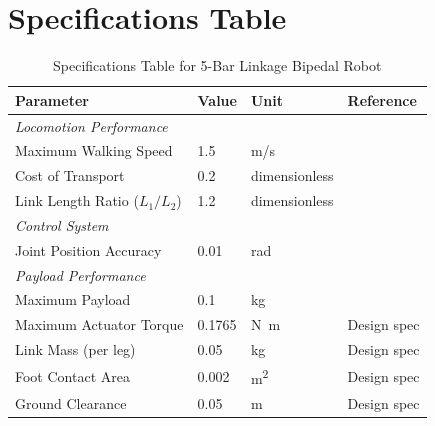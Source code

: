\documentclass[12pt]{article}
\renewcommand{\arraystretch}{2} %
\begin{document}




\section*{Specifications Table}

\begin{table}[H]
\centering
\renewcommand{\arraystretch}{1.3}
\begin{tabular}{p{} p{} l p{}}
\toprule
\textbf{Parameter} & \textbf{Value} & \textbf{Unit} & \textbf{Reference} \\
\midrule
\multicolumn{4}{l}{\textit{Locomotion Performance}} \\
Maximum Walking Speed & 1.5 & \si{m/s} & \cite{zhou2020} \\
Cost of Transport & 0.2 & dimensionless & \cite{rezazadeh2018} \\
Link Length Ratio ($L_1/L_2$) & 1.2 & dimensionless & \cite{liu2021} \\
\midrule
\multicolumn{4}{l}{\textit{Control System}} \\
Joint Position Accuracy & 0.01 & \si{rad} & \cite{kuindersma2016} \\
\midrule
\multicolumn{4}{l}{\textit{Payload Performance}} \\
Maximum Payload & 0.1 & \si{kg} & \cite{park2021} \\
Maximum Actuator Torque & 0.1765 & \si{N.m} & Design spec \\
Link Mass (per leg) & 0.05 & \si{kg} & Design spec \\
Foot Contact Area & 0.002 & \si{m^2} & Design spec \\
Ground Clearance & 0.05 & \si{m} & Design spec \\
\bottomrule
\end{tabular}
\caption{Specifications Table for 5-Bar Linkage Bipedal Robot}
\label{tab:specifications}
\end{table}
\end{document}
